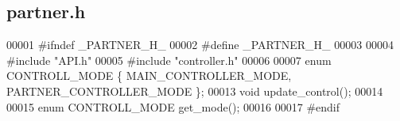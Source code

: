 \subsection{partner.\+h}
\label{partner_8h_source}

\begin{DoxyCode}
00001 \textcolor{preprocessor}{#ifndef \_PARTNER\_H\_}
00002 \textcolor{preprocessor}{#define \_PARTNER\_H\_}
00003 
00004 \textcolor{preprocessor}{#include "API.h"}
00005 \textcolor{preprocessor}{#include "controller.h"}
00006 
00007 \textcolor{keyword}{enum} CONTROLL_MODE \{ MAIN_CONTROLLER_MODE, PARTNER_CONTROLLER_MODE \};
00013 \textcolor{keywordtype}{void} update_control();
00014 
00015 \textcolor{keyword}{enum} CONTROLL_MODE get_mode();
00016 
00017 \textcolor{preprocessor}{#endif}
\end{DoxyCode}
